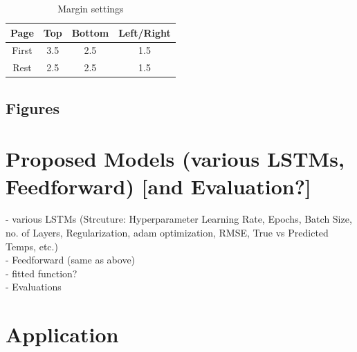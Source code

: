 \documentclass{ifacconf}
\begin{document}
\begin{table}[hb]
  \begin{center}
  \caption{Margin settings}\label{tb:margins}
  \begin{tabular}{cccc}
  Page & Top & Bottom & Left/Right \\\hline
  First & 3.5 & 2.5 & 1.5 \\
  Rest & 2.5 & 2.5 & 1.5 \\ \hline
  \end{tabular}
  \end{center}
  \end{table}
\subsection{Figures}



\section{Proposed Models (various LSTMs, Feedforward) [and Evaluation?]}
- various LSTMs (Strcuture: Hyperparameter {Learning Rate, Epochs, Batch Size, no. of Layers, Regularization, adam optimization}, RMSE, True vs Predicted Temps, etc.)\\
- Feedforward (same as above)\\
- fitted function?\\
- Evaluations


\section{Application}
\end{document}
